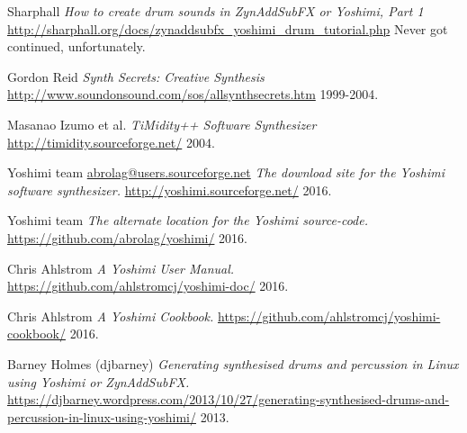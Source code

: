 \begin{thebibliography}{99}
   Sharphall
   \emph{How to create drum sounds in ZynAddSubFX or Yoshimi, Part 1}
   \url{http://sharphall.org/docs/zynaddsubfx\_yoshimi\_drum\_tutorial.php}
   Never got continued, unfortunately.

   Gordon Reid
   \emph{Synth Secrets:  Creative Synthesis}
   \url{http://www.soundonsound.com/sos/allsynthsecrets.htm}
   1999-2004.

   Masanao Izumo et al.
   \emph{TiMidity++ Software Synthesizer}
   \url{http://timidity.sourceforge.net/}
   2004.

   Yoshimi team \url{abrolag@users.sourceforge.net}
   \emph{The download site for the Yoshimi software synthesizer.}
   \url{http://yoshimi.sourceforge.net/}
   2016.

   Yoshimi team
   \emph{The alternate location for the Yoshimi source-code.}
   \url{https://github.com/abrolag/yoshimi/}
   2016.

   Chris Ahlstrom
   \emph{A Yoshimi User Manual.}
   \url{https://github.com/ahlstromcj/yoshimi-doc/}
   2016.

   Chris Ahlstrom
   \emph{A Yoshimi Cookbook.}
   \url{https://github.com/ahlstromcj/yoshimi-cookbook/}
   2016.
   
   Barney Holmes (djbarney)
   \emph{Generating synthesised drums and percussion in Linux using Yoshimi
   or ZynAddSubFX.}
   \url{https://djbarney.wordpress.com/2013/10/27/generating-synthesised-drums-and-percussion-in-linux-using-yoshimi/}
   2013.

\end{thebibliography}

